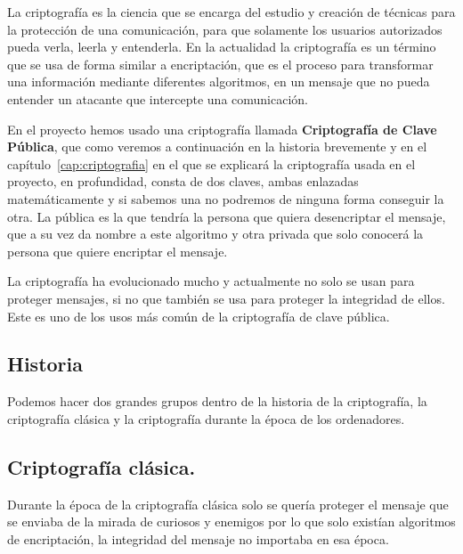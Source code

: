 La criptografía es la ciencia que se encarga del estudio y creación de técnicas para la protección de una comunicación, para que solamente los usuarios autorizados pueda verla, leerla y entenderla. En la actualidad la criptografía es un término que se usa de forma similar a encriptación, que es el proceso para transformar una información mediante diferentes algoritmos, en un mensaje que no pueda entender un atacante que intercepte una comunicación. 

En el proyecto hemos usado una criptografía llamada \textbf{Criptografía de Clave Pública}, que como veremos a continuación en la historia brevemente y en el capítulo~\ref{cap:criptografia} en el que se explicará la criptografía usada en el proyecto, en profundidad, consta de dos claves, ambas enlazadas matemáticamente y si sabemos una no podremos de ninguna forma conseguir la otra. La pública  es la que tendría la persona que quiera desencriptar el mensaje, que a su vez da nombre a este algoritmo y otra privada que solo conocerá la persona que quiere encriptar el mensaje.

La criptografía ha evolucionado mucho y actualmente no solo se usan para proteger mensajes, si no que también se usa para proteger la integridad de ellos. Este es uno de los usos más común de la criptografía de clave pública.

\subsection{Historia}

Podemos hacer dos grandes grupos dentro de la historia de la criptografía, la criptografía clásica y la criptografía durante la época de los ordenadores.

\subsection{Criptografía clásica.}

	Durante la época de la criptografía clásica solo se quería proteger el mensaje que se enviaba de la mirada de curiosos y enemigos por lo que solo existían algoritmos de encriptación, la integridad del mensaje no importaba en esa época.  
	
